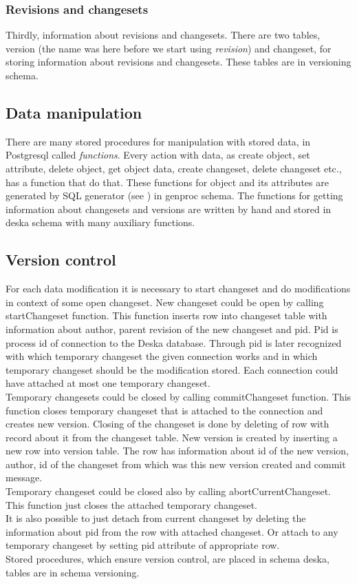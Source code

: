 \documentclass[deska]{subfiles}
\begin{document}
\subsubsection{Revisions and changesets}
Thirdly, information about revisions and changesets. There are two tables, version (the name was here before
we start using {\em revision}) and changeset, for storing information about revisions and changesets. These tables are
in versioning schema.

\subsection{Data manipulation}
There are many stored procedures for manipulation with stored data, in Postgresql called {\em functions}.
Every action with data, as create object, set attribute, delete object, get object data, create changeset, delete changeset etc.,
has a function that do that. These functions for object and its attributes are generated by SQL generator (see ) in genproc schema.
The functions for getting information about changesets and versions are written by hand and stored in deska schema with many auxiliary functions.

\subsection{Version control}
For each data modification it is necessary to start changeset and do modifications in context of some open changeset. New changeset could be open by calling startChangeset function. This function inserts row into changeset table with information about author, parent revision of the new changeset and pid. Pid is process id of connection to the Deska database. Through pid is later recognized with which temporary changeset the given connection works and in which temporary changeset should be the modification stored. Each connection could have attached at most one temporary changeset.\\
Temporary changesets could be closed by calling commitChangeset function. This function closes temporary changeset that is attached to the connection and creates new version. Closing of the changeset is done by deleting of row with record about it from the changeset table. New version is created by inserting a new row into version table. The row has information about id of the new version, author, id of the changeset from which was this new version created and commit message.\\
Temporary changeset could be closed also by calling abortCurrentChangeset. This function just closes the attached temporary changeset.\\
It is also possible to just detach from current changeset by deleting the information about pid from the row with attached changeset. Or attach to any temporary changeset by setting pid attribute of appropriate row.\\
Stored procedures, which ensure version control, are placed in schema deska, tables are in schema versioning.
\end{document}
